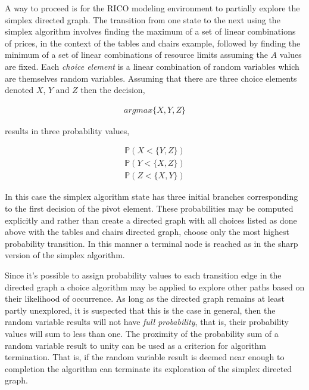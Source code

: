 A way to proceed is for the RICO modeling environment to partially explore the simplex directed graph. The transition from one state to the next using the simplex algorithm involves finding the maximum of a set of linear combinations of prices, in the context of the tables and chairs example, followed by finding the minimum of a set of linear combinations of resource limits assuming the $A$ values are fixed. Each \emph{choice element} is a linear combination of random variables which are themselves random variables. Assuming that there are three choice elements denoted $X$, $Y$ and $Z$ then the decision,

\begin{align*}
argmax\{X, Y, Z\}
\end{align*}

results in three probability values,

\begin{align*}
\mathbb{P}(X < \{Y, Z\})\\
\mathbb{P}(Y < \{X,Z\})\\
\mathbb{P}(Z < \{X,Y\})
\end{align*}

In this case the simplex algorithm state has three initial branches corresponding to the first decision of the pivot element. These probabilities may be computed explicitly and rather than create a directed graph with all choices listed as done above with the tables and chairs directed graph, choose only the most highest probability transition. In this manner a terminal node is reached as in the sharp version of the simplex algorithm. 

Since it's possible to assign probability values to each transition edge in the directed graph a choice algorithm may be applied to explore other paths based on their likelihood of occurrence. As long as the directed graph remains at least partly unexplored, it is suspected that this is the case in general, then the random variable results will not have \emph{full   probability}, that is, their probability values will sum to less than one. The proximity of the probability sum of a random variable result to unity can be used as a criterion for algorithm termination. That is, if the random variable result is deemed near enough to completion the algorithm can terminate its exploration of the simplex directed graph.

